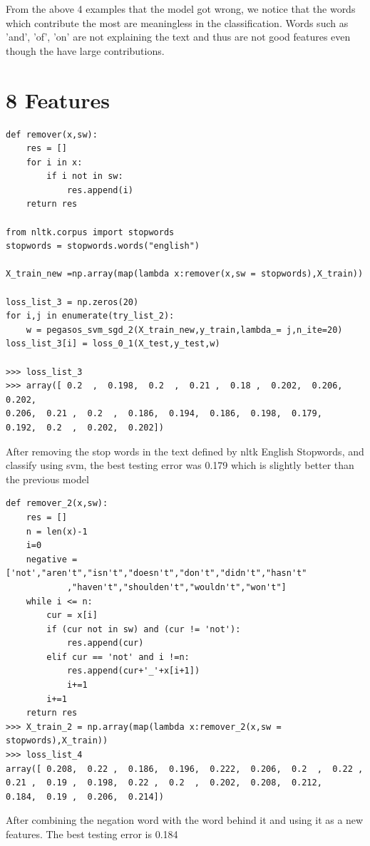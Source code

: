 \documentclass{article}
\newenvironment{sub}[2][$-$]{\begin{trivlist}
		\item[\hskip \labelsep {\bfseries #1}\hskip \labelsep {\bfseries #2.}]}  {\end{trivlist}}
\begin{document}
From the above 4 examples that the model got wrong, we notice that the words which contribute the most are meaningless in the classification. Words such as 'and', 'of', 'on' are not explaining the text and thus are not good features even though the have large contributions. 

\section{8 Features}
\begin{sub}{8.1 Removing stop words}
\end{sub}

\begin{verbatim}
def remover(x,sw):
	res = []
	for i in x:
		if i not in sw:
			res.append(i)
	return res

from nltk.corpus import stopwords
stopwords = stopwords.words("english")

X_train_new =np.array(map(lambda x:remover(x,sw = stopwords),X_train))

loss_list_3 = np.zeros(20)
for i,j in enumerate(try_list_2):
	w = pegasos_svm_sgd_2(X_train_new,y_train,lambda_= j,n_ite=20)
loss_list_3[i] = loss_0_1(X_test,y_test,w)

>>> loss_list_3
>>> array([ 0.2  ,  0.198,  0.2  ,  0.21 ,  0.18 ,  0.202,  0.206,  0.202,
0.206,  0.21 ,  0.2  ,  0.186,  0.194,  0.186,  0.198,  0.179,
0.192,  0.2  ,  0.202,  0.202])
\end{verbatim}

After removing the stop words in the text defined by nltk English Stopwords, and classify using svm, the best testing error was 0.179 which is slightly better than the previous model 

\pagebreak

\begin{sub}{8.2 Combine negations}
\end{sub}

\begin{verbatim}
def remover_2(x,sw):
	res = []
	n = len(x)-1
	i=0
	negative = ['not',"aren't","isn't","doesn't","don't","didn't","hasn't"
			,"haven't","shoulden't","wouldn't","won't"]
	while i <= n:
		cur = x[i]
		if (cur not in sw) and (cur != 'not'):
			res.append(cur)
		elif cur == 'not' and i !=n:
			res.append(cur+'_'+x[i+1])
			i+=1
		i+=1
	return res
>>> X_train_2 = np.array(map(lambda x:remover_2(x,sw = stopwords),X_train))
>>> loss_list_4
array([ 0.208,  0.22 ,  0.186,  0.196,  0.222,  0.206,  0.2  ,  0.22 ,
0.21 ,  0.19 ,  0.198,  0.22 ,  0.2  ,  0.202,  0.208,  0.212,
0.184,  0.19 ,  0.206,  0.214])
\end{verbatim}

After combining the negation word with the word behind it and using it as a new features. The best testing error is 0.184
\end{document}
